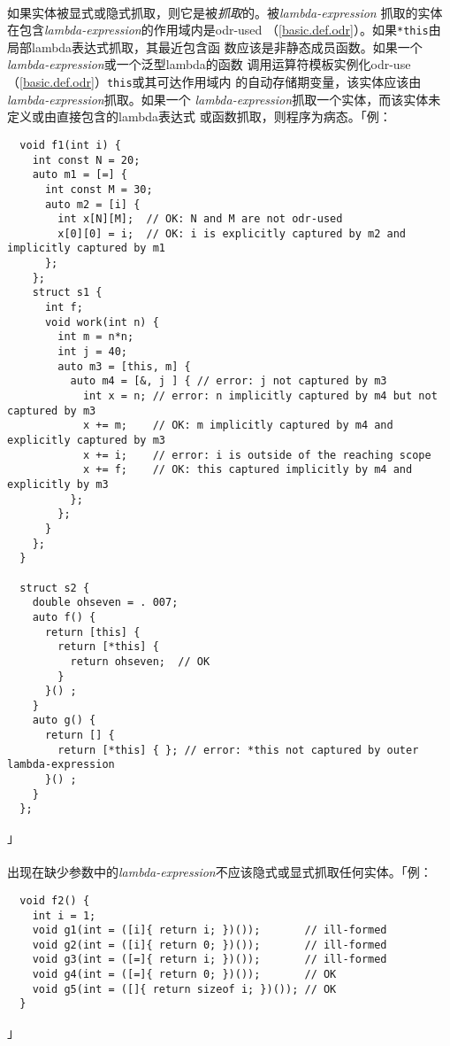 \paragraph{}
如果实体被显式或隐式抓取，则它是被\textit{抓取}的。被\textit{lambda-expression}
抓取的实体在包含\textit{lambda-expression}的作用域内是odr-used
（\ref{basic.def.odr}）。如果\texttt{*this}由局部lambda表达式抓取，其最近包含函
数应该是非静态成员函数。如果一个\textit{lambda-expression}或一个泛型lambda的函数
调用运算符模板实例化odr-use（\ref{basic.def.odr}）\texttt{this}或其可达作用域内
的自动存储期变量，该实体应该由\textit{lambda-expression}抓取。如果一个
\textit{lambda-expression}抓取一个实体，而该实体未定义或由直接包含的lambda表达式
或函数抓取，则程序为病态。「例：
\begin{lstlisting}
  void f1(int i) {
    int const N = 20;
    auto m1 = [=] {
      int const M = 30;
      auto m2 = [i] {
        int x[N][M];  // OK: N and M are not odr-used
        x[0][0] = i;  // OK: i is explicitly captured by m2 and implicitly captured by m1
      };
    };
    struct s1 {
      int f;
      void work(int n) {
        int m = n*n;
        int j = 40;
        auto m3 = [this, m] {
          auto m4 = [&, j ] { // error: j not captured by m3
            int x = n; // error: n implicitly captured by m4 but not captured by m3
            x += m;    // OK: m implicitly captured by m4 and explicitly captured by m3
            x += i;    // error: i is outside of the reaching scope
            x += f;    // OK: this captured implicitly by m4 and explicitly by m3
          };
        };
      }
    };
  }

  struct s2 {
    double ohseven = . 007;
    auto f() {
      return [this] {
        return [*this] {
          return ohseven;  // OK
        }
      }() ;
    }
    auto g() {
      return [] {
        return [*this] { }; // error: *this not captured by outer lambda-expression
      }() ;
    }
  };
\end{lstlisting}」

\paragraph{}
出现在缺少参数中的\textit{lambda-expression}不应该隐式或显式抓取任何实体。「例：
\begin{lstlisting}
  void f2() {
    int i = 1;
    void g1(int = ([i]{ return i; })());       // ill-formed
    void g2(int = ([i]{ return 0; })());       // ill-formed
    void g3(int = ([=]{ return i; })());       // ill-formed
    void g4(int = ([=]{ return 0; })());       // OK
    void g5(int = ([]{ return sizeof i; })()); // OK
  }
\end{lstlisting}」


